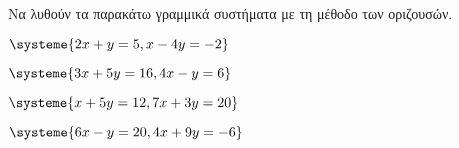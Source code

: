 Να λυθούν τα παρακάτω γραμμικά συστήματα με τη μέθοδο των οριζουσών.
\begin{multicols}{2}
\begin{rlist}[leftmargin=5mm]
\item $ \systeme{2x+y=5,x-4y=-2} $
\item $ \systeme{3x+5y=16,4x-y=6} $
\item $ \systeme{x+5y=12,7x+3y=20} $
\item $ \systeme{6x-y=20,4x+9y=-6} $
\end{rlist}
\end{multicols}
